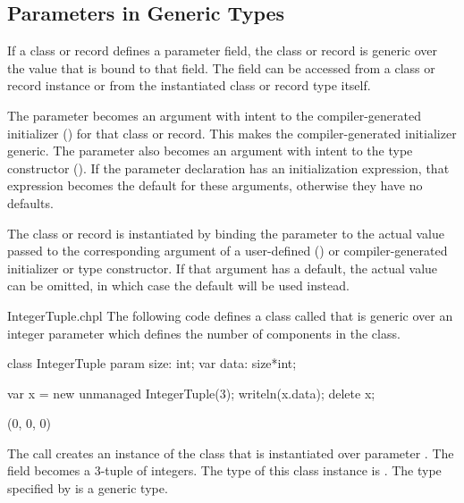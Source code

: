\subsection{Parameters in Generic Types}
\label{Parameters_in_Generic_Types}

If a class or record defines a parameter field, the class or record
is generic over the value that is bound to that field.
The field can be accessed from a class or record instance or from the
instantiated class or record type itself.

The parameter becomes an argument with intent  to the
compiler-generated initializer ()
for that class or record.  This makes the compiler-generated
initializer generic.  The parameter also becomes an argument
with intent  to the type  constructor ().
If the parameter declaration has an initialization expression, that expression
becomes the default for these arguments, otherwise they have no defaults.

The class or record is instantiated by binding the parameter
to the actual value passed to the corresponding argument of
a user-defined ()
or compiler-generated initializer or type constructor.
If that argument has a default, the actual value can be omitted, in
which case the default will be used instead.

\begin{chapelexample}{IntegerTuple.chpl}
The following code defines a class called  that is
generic over an integer parameter which defines the number of
components in the class.
\begin{chapel}
class IntegerTuple {
  param size: int;
  var data: size*int;
}
\end{chapel}
\begin{chapelpost}
var x = new unmanaged IntegerTuple(3);
writeln(x.data);
delete x;
\end{chapelpost}
\begin{chapeloutput}
(0, 0, 0)
\end{chapeloutput}
The call  creates an instance of the
 class that is instantiated over parameter
.  The field  becomes a 3-tuple of integers.  The
type of this class instance is .  The type
specified by  is a generic type.
\end{chapelexample}

